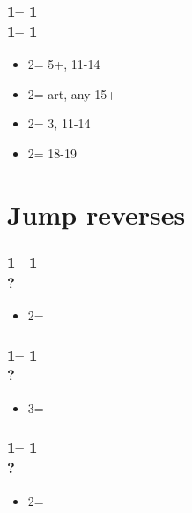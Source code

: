 \documentclass[12pt, a4paper]{report}
\begin{document}
{{{            \subsubsection*{1\clubs -- 1\hearts\\
                            1\spades -- 1\nt\\}
            \begin{itemize}
                \item 2\clubs = 5+\clubs, 11-14
                \item 2\diams = art, any 15+ \unbal
                \item 2\hearts = 3\hearts, 11-14
                \item 2\nt = 18-19 \bal\ \gf
            \end{itemize}
        }

        \section*{\colorbox{blue!30}{Jump reverses}}
         {

            \subsubsection*{1\clubs -- 1\hearts\\
                            ?}
            \begin{itemize}
                \item 2\spades = \clubs\ \gf
            \end{itemize}

            \subsubsection*{1\clubs -- 1\spades\\
                            ?}
            \begin{itemize}
                \item 3\diams = \clubs\ \gf
            \end{itemize}

            \subsubsection*{1\diams -- 1\hearts\\
                            ?}
            \begin{itemize}
                \item 2\spades = \diams\ \gf
            \end{itemize}

}}}
\end{document}
